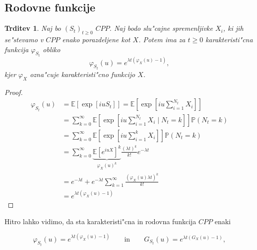 \documentclass[12pt, a4paper, reqno]{amsart}
\theoremstyle{definition} %
\theoremstyle{plain} %
\newtheorem{trditev}[definicija]{Trditev}
\newcommand{\E}{\mathbb{E}}
\newcommand{\Prob}{\mathbb{P}}
\newcommand{\1}{\mathds{1}}
\begin{document}
    \subsection{Rodovne funkcije}

    \begin{trditev}
        Naj bo $(S_t)_{t\geq0}$ $CPP$. Naj bodo slu"cajne spremenljivke $X_i$, ki jih se"stevamo v 
        $CPP$ enako porazdeljene kot $X$. Potem ima za $t\geq0$ karakteristi"cna funkcija $\varphi_{S_t}$ 
        obliko
        \begin{equation*}
            \varphi_{S_t}(u) = e^{\lambda t\left(\varphi_X(u) - 1\right)}, 
        \end{equation*}
        kjer $\varphi_X$ ozna"cuje karakteristi"cno funkcijo $X$.
        \label{trd:MomentGener}
    \end{trditev}
    
    \begin{proof}
        \begin{align}
            \varphi_{S_t}(u) 
                    &= \E\left[\exp\left[iuS_t\right]\right] = \nonumber
                        \E\left[\exp\left[iu\sum_{i = 1}^{N_t}X_i\right]\right] \nonumber\\
                    &= \sum_{k=0}^{\infty}
                        \E\left[\exp\left[iu\sum_{i = 1}^{N_t}X_i\mid N_t=k\right]\right]\Prob\left(N_t = k\right) \nonumber \\ 
                    &= \sum_{k=0}^{\infty}
                        \E\left[\exp\left[iu\sum_{i = 1}^kX_i\right]\right]\Prob\left(N_t = k\right) \nonumber \\
                    &= \sum_{k=0}^{\infty}
                        \underbrace{\E\left[e^{iuX}\right]^k}_{\varphi_X(u)^k}\frac{(\lambda t)^k}{k!}e^{-\lambda t} \label{eq:MomentS_t}\\ 
                    &= e^{-\lambda t} + e^{-\lambda t}\sum_{k=1}^\infty\frac{\left(\varphi_X(u)\lambda t\right)^k}{k!} \nonumber \\
                    &= e^{\lambda t\left(\varphi_X(u) - 1\right)} \nonumber
        \end{align}
    \end{proof}

    Hitro lahko vidimo, da sta karakteristi"cna in rodovna funkcija $CPP$ enaki

    \begin{equation*}
        \varphi_{S_t}(u) = e^{\lambda t\left(\varphi_X(u) - 1\right)} \qquad \text{in} \qquad 
        G_{S_t}(u) = e^{\lambda t\left(G_X(u) - 1\right)},
    \end{equation*} 
\end{document}
